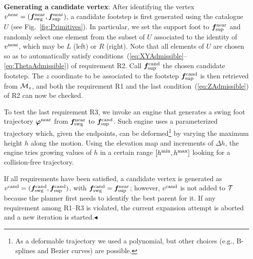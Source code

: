 {\bf Generating a candidate vertex}:  
After identifying the vertex $v^{\rm near}=({\bm{f}}_{\rm swg}^{\rm near},{\bm{f}}_{\rm sup}^{\rm near})$, a candidate footstep is first generated using the catalogue $U$ (see Fig.~\ref{fig:Primitives}). In particular, we set the support foot to ${\bm{f}}_{\rm sup}^{\rm near}$ and randomly select one element from the subset of $U$ associated to the identity of $v^{\rm near}$, which may be $L$ (left) or $R$ (right). Note that all elements of $U$ are chosen so as to automatically satisfy conditions~(\ref{eq:XYAdmissible}--\ref{eq:ThetaAdmissible}) of requirement R2.
Call ${\bm{f}}_{\rm sup}^{\rm cand}$ the chosen candidate footstep. The $z$ coordinate to be associated to the footstep ${\bm{f}}_{\rm sup}^{\rm cand}$ is then retrieved from ${\cal M}_{z}$, and both the requirement R1 and the last condition~(\ref{eq:ZAdmissible}) of R2 can now be checked.

To test the last requirement R3, we invoke an engine that generates a swing foot trajectory ${\bm{\varphi}}^{\rm near}$ from ${\bm{f}}_{\rm swg}^{\rm near}$ to ${\bm{f}}_{\rm sup}^{\rm cand}$. Such engine uses a parameterized trajectory which, given the endpoints, can be deformed\footnote{As a deformable trajectory we used a polynomial, but other choices (e.g., B-splines and Bezier curves) are possible.} by varying the maximum height $h$ along the motion. 
Using the elevation map and increments of $\Delta h$, the engine tries growing values of $h$ in a certain range $[h^{\rm min}, h^{\rm max}]$ looking for a collision-free trajectory.

If all requirements have been satisfied, a candidate vertex is generated as $v^{\rm cand} = ({\bm{f}}_{\rm swg}^{\rm cand}, {\bm{f}}_{\rm sup}^{\rm cand})$, with ${\bm{f}}_{\rm swg}^{\rm cand} = {\bm{f}}_{\rm sup}^{\rm near}$; however, $v^{\rm cand}$ is not added to $\cal T$ because the planner first needs to identify the best parent for it.
If any requirement among R1--R3 is violated, the current expansion attempt is aborted and a new iteration is started.\hfill $\blacktriangleleft$

